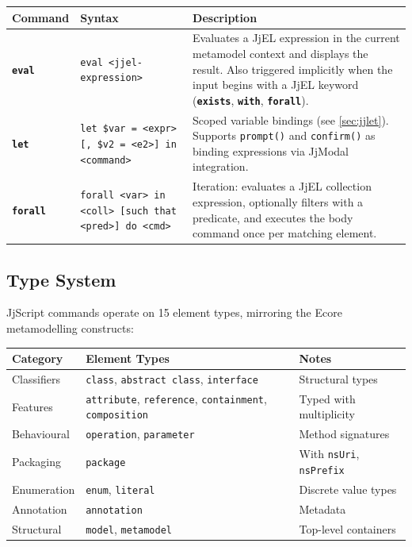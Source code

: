 \documentclass[11pt,a4paper]{article}
\newcommand{\jjmodal}{\textsf{JjModal}}
\newcommand{\jjscript}{\textsf{JjScript}}
\newcommand{\jjel}{\textsf{JjEL}}
\newcommand{\kw}[1]{\texttt{\textbf{#1}}}
\begin{document}
\begin{center}
\small
\begin{tabularx}{\textwidth}{@{}llX@{}}
\toprule
\textbf{Command} & \textbf{Syntax} & \textbf{Description} \\
\midrule
\kw{eval} & \texttt{eval <jjel-expression>} &
    Evaluates a \jjel{} expression in the current metamodel context
    and displays the result. Also triggered implicitly when the input
    begins with a \jjel{} keyword (\kw{exists}, \kw{with},
    \kw{forall}). \\
\addlinespace
\kw{let} & \texttt{let \$var = <expr> [, \$v2 = <e2>] in <command>} &
    Scoped variable bindings (see \cref{sec:jjlet}). Supports
    \texttt{prompt()} and \texttt{confirm()} as binding expressions
    via \jjmodal{} integration. \\
\addlinespace
\kw{forall} & \texttt{forall <var> in <coll> [such that <pred>] do <cmd>} &
    Iteration: evaluates a \jjel{} collection expression, optionally
    filters with a predicate, and executes the body command once per
    matching element. \\
\bottomrule
\end{tabularx}
\end{center}


\subsection{Type System}\label{sec:jjscript-types}

\jjscript{} commands operate on 15 element types, mirroring the Ecore
metamodelling constructs:

\begin{center}
\small
\begin{tabular}{@{}lll@{}}
\toprule
\textbf{Category} & \textbf{Element Types} & \textbf{Notes} \\
\midrule
Classifiers & \texttt{class}, \texttt{abstract class}, \texttt{interface} & Structural types \\
Features & \texttt{attribute}, \texttt{reference}, \texttt{containment}, \texttt{composition} & Typed with multiplicity \\
Behavioural & \texttt{operation}, \texttt{parameter} & Method signatures \\
Packaging & \texttt{package} & With \texttt{nsUri}, \texttt{nsPrefix} \\
Enumeration & \texttt{enum}, \texttt{literal} & Discrete value types \\
Annotation & \texttt{annotation} & Metadata \\
Structural & \texttt{model}, \texttt{metamodel} & Top-level containers \\
\bottomrule
\end{tabular}
\end{center}
\end{document}
